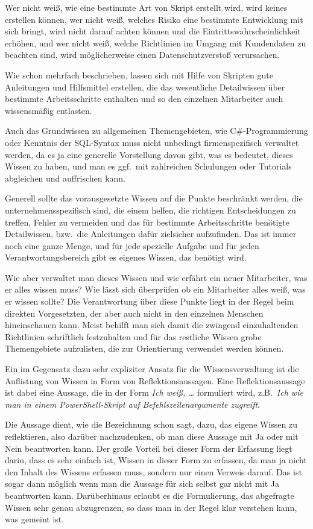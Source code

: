 Wer nicht weiß, wie eine bestimmte Art von Skript erstellt wird, wird keines erstellen können, wer nicht weiß, welches Risiko eine bestimmte Entwicklung mit sich bringt, wird nicht darauf achten können und die Eintrittswahrscheinlichkeit erhöhen, und wer nicht weiß, welche Richtlinien im Umgang mit Kundendaten zu beachten sind, wird möglicherweise einen Datenschutzverstoß verursachen.

Wie schon mehrfach beschrieben, lassen sich mit Hilfe von Skripten gute Anleitungen und Hilfsmittel erstellen, die das wesentliche Detailwissen über bestimmte Arbeitsschritte enthalten und so den einzelnen Mitarbeiter auch wissensmäßig entlasten.

Auch das Grundwissen zu allgemeinen Themengebieten, wie C\#-Programmierung oder Kenntnis der SQL-Syntax muss nicht unbedingt firmenspezifisch verwaltet werden, da es ja eine generelle Vorstellung davon gibt, was es bedeutet, dieses Wissen zu haben, und man es ggf.\ mit zahlreichen Schulungen oder Tutorials abgleichen und auffrischen kann.

Generell sollte das vorausgesetzte Wissen auf die Punkte beschränkt werden, die unternehmensspezifisch sind, die einem helfen, die richtigen Entscheidungen zu treffen, Fehler zu vermeiden und das für bestimmte Arbeitsschritte benötigte Detailwissen, bzw.\ die Anleitungen dafür zielsicher aufzufinden. Das ist immer noch eine ganze Menge, und für jede spezielle Aufgabe und für jeden Verantwortungsbereich gibt es eigenes Wissen, das benötigt wird.

Wie aber verwaltet man dieses Wissen und wie erfährt ein neuer Mitarbeiter, was er alles wissen muss? Wie lässt sich überprüfen ob ein Mitarbeiter alles weiß, was er wissen sollte? Die Verantwortung über diese Punkte liegt in der Regel beim direkten Vorgesetzten, der aber auch nicht in den einzelnen Menschen hineinschauen kann. Meist behilft man sich damit die zwingend einzuhaltenden Richtlinien schriftlich festzuhalten und für das restliche Wissen grobe Themengebiete aufzulisten, die zur Orientierung verwendet werden können. 

Ein im Gegensatz dazu sehr expliziter Ansatz für die Wissensverwaltung ist die Auf\-lis\-tung von Wissen in Form von Reflektionsaussagen. Eine Reflektionsaussage ist dabei eine Aussage, die in der Form \emph{Ich weiß, \dots} formuliert wird, z.B.\ \emph{Ich wie man in einem PowerShell-Skript auf Befehlszeilenargumente zugreift}.

Die Aussage dient, wie die Bezeichnung schon sagt, dazu, das eigene Wissen zu reflektieren, also darüber nachzudenken, ob man diese Aussage mit Ja oder mit Nein beantworten kann. Der große Vorteil bei dieser Form der Erfassung liegt darin, dass es sehr einfach ist, Wissen in dieser Form zu erfassen, da man ja nicht den Inhalt des Wissens erfassen muss, sondern nur einen Verweis darauf. Das ist sogar dann möglich wenn man die Aussage für sich selbst gar nicht mit Ja beantworten kann. Darüberhinaus erlaubt es die Formulierung, das abgefragte Wissen sehr genau abzugrenzen, so dass man in der Regel klar verstehen kann, was gemeint ist.

